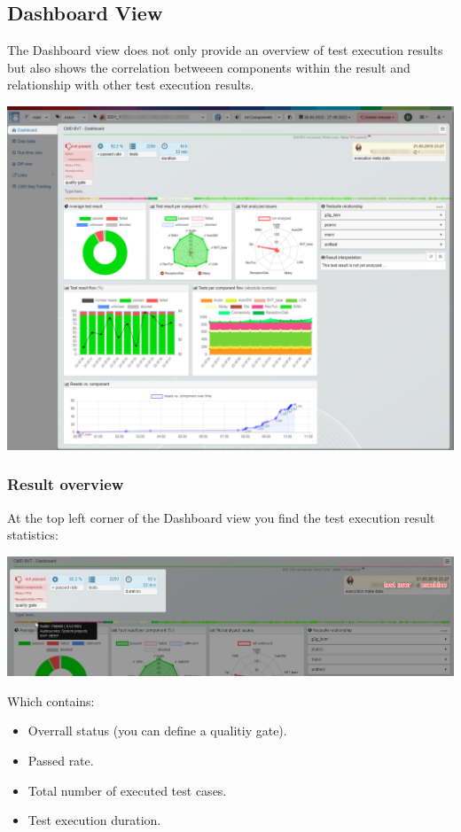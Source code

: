 \hypertarget{dashboard-view}{%
\subsection{Dashboard View}\label{dashboard-view}}
The Dashboard view does not only provide an overview of test execution results but
also shows the correlation betweeen components within the result and relationship with other test execution results.

\includegraphics[width=1\linewidth]{./pictures/view_dashboard.png}

\subsubsection{Result overview}
At the top left corner of the Dashboard view you find the test execution result
statistics:

\includegraphics[width=1\linewidth]{./pictures/dashboard/result_statistics.png}

Which contains:
\begin{itemize}
   \item Overrall status (you can define a qualitiy gate).
   \item Passed rate.
   \item Total number of executed test cases.
   \item Test execution duration.
\end{itemize}

